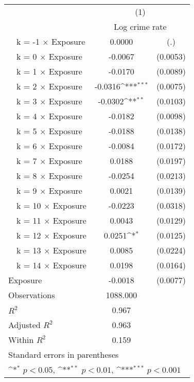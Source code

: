 {
\def\sym#1{\ifmmode^{#1}\else\(^{#1}\)\fi}
\begin{tabular}{l*{1}{cc}}
\toprule
                &\multicolumn{2}{c}{(1)}     \\
                &\multicolumn{2}{c}{Log crime rate}\\
\midrule
~~k = -1 $\times$ Exposure&   0.0000         &      (.)\\
~~k = 0 $\times$ Exposure&  -0.0067         & (0.0053)\\
~~k = 1 $\times$ Exposure&  -0.0170         & (0.0089)\\
~~k = 2 $\times$ Exposure&  -0.0316\sym{***}& (0.0075)\\
~~k = 3 $\times$ Exposure&  -0.0302\sym{**} & (0.0103)\\
~~k = 4 $\times$ Exposure&  -0.0182         & (0.0098)\\
~~k = 5 $\times$ Exposure&  -0.0188         & (0.0138)\\
~~k = 6 $\times$ Exposure&  -0.0084         & (0.0172)\\
~~k = 7 $\times$ Exposure&   0.0188         & (0.0197)\\
~~k = 8 $\times$ Exposure&  -0.0254         & (0.0213)\\
~~k = 9 $\times$ Exposure&   0.0021         & (0.0139)\\
~~k = 10 $\times$ Exposure&  -0.0223         & (0.0318)\\
~~k = 11 $\times$ Exposure&   0.0043         & (0.0129)\\
~~k = 12 $\times$ Exposure&   0.0251\sym{*}  & (0.0125)\\
~~k = 13 $\times$ Exposure&   0.0085         & (0.0224)\\
~~k = 14 $\times$ Exposure&   0.0198         & (0.0164)\\
Exposure        &  -0.0018         & (0.0077)\\
\midrule
Observations    & 1088.000         &         \\
\(R^{2}\)       &    0.967         &         \\
Adjusted \(R^{2}\)&    0.963         &         \\
Within \(R^{2}\)&    0.159         &         \\
\bottomrule
\multicolumn{3}{l}{\footnotesize Standard errors in parentheses}\\
\multicolumn{3}{l}{\footnotesize \sym{*} \(p<0.05\), \sym{**} \(p<0.01\), \sym{***} \(p<0.001\)}\\
\end{tabular}
}
